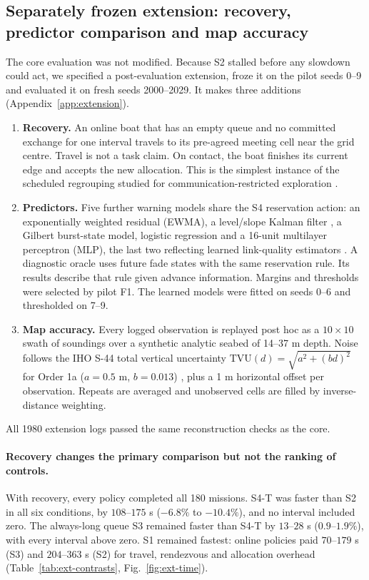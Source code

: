 \subsection{Separately frozen extension: recovery, predictor comparison and map accuracy}\label{sec:extension}
The core evaluation was not modified. Because S2 stalled before any slowdown could act, we specified a post-evaluation extension, froze it on the pilot seeds 0--9 and evaluated it on fresh seeds 2000--2029. It makes three additions (Appendix~\ref{app:extension}).
\begin{enumerate}[label=\textbf{E\arabic*.},leftmargin=*]
\item \textbf{Recovery.} An online boat that has an empty queue and no committed exchange for one interval travels to its pre-agreed meeting cell near the grid centre. Travel is not a task claim. On contact, the boat finishes its current edge and accepts the new allocation. This is the simplest instance of the scheduled regrouping studied for communication-restricted exploration \cite{hollinger2010periodic,dasilva2024rendezvous,tan2024ir2}.
\item \textbf{Predictors.} Five further warning models share the S4 reservation action: an exponentially weighted residual (EWMA), a level/slope Kalman filter \cite{parasuraman2023rapid}, a Gilbert burst-state model, logistic regression and a 16-unit multilayer perceptron (MLP), the last two reflecting learned link-quality estimators \cite{cerar2021lqe,kanto2024lstm}. A diagnostic oracle uses future fade states with the same reservation rule. Its results describe that rule given advance information. Margins and thresholds were selected by pilot F1. The learned models were fitted on seeds 0--6 and thresholded on 7--9.
\item \textbf{Map accuracy.} Every logged observation is replayed post hoc as a $10\times10$ swath of soundings over a synthetic analytic seabed of 14--37 m depth. Noise follows the IHO S-44 total vertical uncertainty $\mathrm{TVU}(d)=\sqrt{a^2+(bd)^2}$ for Order 1a ($a=0.5$ m, $b=0.013$) \cite{iho2020s44}, plus a 1 m horizontal offset per observation. Repeats are averaged and unobserved cells are filled by inverse-distance weighting.
\end{enumerate}
All 1980 extension logs passed the same reconstruction checks as the core.

\paragraph{Recovery changes the primary comparison but not the ranking of controls.} With recovery, every policy completed all 180 missions. S4-T was faster than S2 in all six conditions, by $108$--$175$ s ($-6.8\%$ to $-10.4\%$), and no interval included zero. The always-long queue S3 remained faster than S4-T by $13$--$28$ s ($0.9$--$1.9\%$), with every interval above zero. S1 remained fastest: online policies paid $70$--$179$ s (S3) and $204$--$363$ s (S2) for travel, rendezvous and allocation overhead (Table~\ref{tab:ext-contrasts}, Fig.~\ref{fig:ext-time}).

